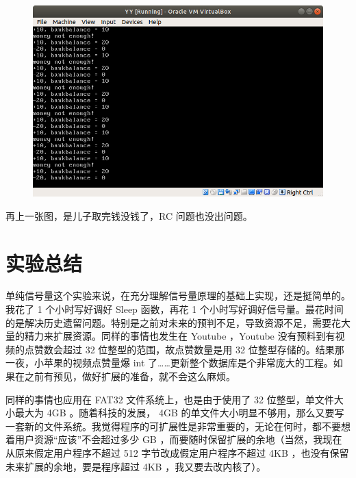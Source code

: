 \documentclass[a4paper]{article}
\begin{document}
\begin{figure}[!hbp]
	\centering
	\includegraphics[scale=0.55]{pics/4.png}
\end{figure}

再上一张图，是儿子取完钱没钱了，RC 问题也没出问题。

\section{实验总结}

单纯信号量这个实验来说，在充分理解信号量原理的基础上实现，还是挺简单的。我花了 1 个小时写好调好 Sleep 函数，再花 1 个小时写好调好信号量。最花时间的是解决历史遗留问题。特别是之前对未来的预判不足，导致资源不足，需要花大量的精力来扩展资源。同样的事情也发生在 Youtube ，Youtube 没有预料到有视频的点赞数会超过 32 位整型的范围，故点赞数量是用 32 位整型存储的。结果那一夜，小苹果的视频点赞量爆 int 了……更新整个数据库是个非常庞大的工程。如果在之前有预见，做好扩展的准备，就不会这么麻烦。

同样的事情也应用在 FAT32 文件系统上，也是由于使用了 32 位整型，单文件大小最大为 4GB 。随着科技的发展， 4GB 的单文件大小明显不够用，那么又要写一套新的文件系统。我觉得程序的可扩展性是非常重要的，无论在何时，都不要想着用户资源“应该”不会超过多少 GB ，而要随时保留扩展的余地（当然，我现在从原来假定用户程序不超过 512 字节改成假定用户程序不超过 4KB ，也没有保留未来扩展的余地，要是程序超过 4KB ，我又要去改内核了）。
\end{document}
